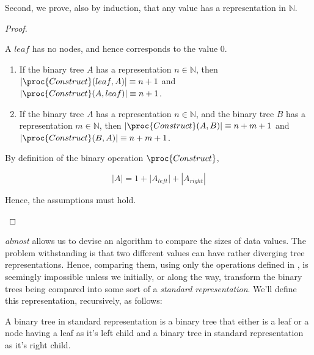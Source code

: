 Second, we prove, also by induction, that any value  has a
representation in $\mathbb{N}$.

\begin{proof}\ \\

\begin{description}[\setleftmargin{70pt}\setlabelstyle{\bf}]

\item [Base] A $leaf$ has no nodes, and hence corresponds to the value $0$.

\item [Assumption]

\begin{enumerate}

\item If the binary tree $A$ has a representation $n\in\mathbb{N}$, then 
$\left|\proc{Construct}(leaf, A)\right|\equiv n+1$ and
$\left|\proc{Construct}(A, leaf)\right|\equiv n+1$.

\item If the binary tree $A$ has a representation $n\in\mathbb{N}$, and the
binary tree $B$ has a representation $m\in\mathbb{N}$, then
$\left|\proc{Construct}(A,B)\right|\equiv n+m+1$ and
$\left|\proc{Construct}(B,A)\right|\equiv n+m+1$.

\end{enumerate}

\item [Induction]

By definition of the binary operation $\proc{Construct}$,

$$\left|A\right|=1+\left|A_{left}\right|+\left|A_{right}\right|$$

Hence, the assumptions must hold.

\end{description}

\end{proof}

 \emph{almost} allows us to devise an algorithm to
compare the sizes of data values. The problem withstanding is that two
different values can have rather diverging tree representations. Hence,
comparing them, using only the operations defined in
, is seemingly impossible unless we
initially, or along the way, transform the binary trees being compared into
some sort of a \emph{standard representation}. We'll define this
representation, recursively, as follows:

\begin{definition}\label{definition:standard-representation}

A binary tree in standard representation is a binary tree that either is a leaf
or a node having a leaf as it's left child and a binary tree in standard
representation as it's right child.

\end{definition}

